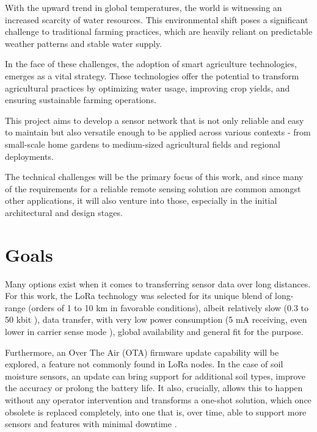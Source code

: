 
With the upward trend in global temperatures, the world is witnessing an increased scarcity of water resources. This environmental shift poses a significant challenge to traditional farming practices, which are heavily reliant on predictable weather patterns and stable water supply. 

In the face of these challenges, the adoption of smart agriculture technologies, emerges as a vital strategy. These technologies offer the potential to transform agricultural practices by optimizing water usage, improving crop yields, and ensuring sustainable farming operations.

This project aims to develop a sensor network that is not only reliable and easy to maintain but also versatile enough to be applied across various contexts - from small-scale home gardens to medium-sized agricultural fields and regional deployments. 

The technical challenges will be the primary focus of this work, and since many of the requirements for a reliable remote sensing solution are common amongst other applications, it will also venture into those, especially in the initial architectural and design stages. 

\section{Goals}
Many options exist when it comes to transferring sensor data over long distances. For this work, the LoRa technology was selected for its unique blend of long-range (orders of 1 to 10 km in favorable conditions), albeit relatively slow (0.3 to 50 kbit \cite{semtech_corporation_sx12612_2024}), data transfer, with very low power consumption (5 mA receiving, even lower in carrier sense mode \cite{semtech_corporation_sx12612_2024}), global availability and general fit for the purpose.

Furthermore, an Over The Air (OTA) firmware update capability will be explored, a feature not commonly found in LoRa nodes. In the case of soil moisture sensors, an update can bring support for additional soil types, improve the accuracy or prolong the battery life. It also, crucially, allows this to happen without any operator intervention and transforms a one-shot solution, which once obsolete is replaced completely, into one that is, over time, able to support more sensors and features with minimal downtime \cite{mobility_connected_what_2024,noauthor_android_2024,bucklin_brown_over--air_2024}.

